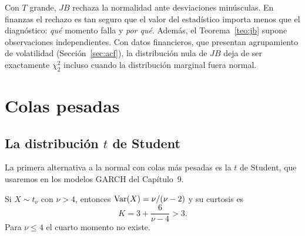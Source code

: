\begin{observacion}
Con $T$ grande, $JB$ rechaza la normalidad ante desviaciones minúsculas. En finanzas el rechazo es tan
seguro que el valor del estadístico importa menos que el diagnóstico: \emph{qué} momento falla y
\emph{por qué}. Además, el Teorema~\ref{teo:jb} supone observaciones independientes. Con datos
financieros, que presentan agrupamiento de volatilidad (Sección~\ref{sec:acf}), la distribución nula de
$JB$ deja de ser exactamente $\chi^2_2$ incluso cuando la distribución marginal fuera normal.
\end{observacion}

\section{Colas pesadas}\label{sec:colas}

\subsection{La distribución $t$ de Student}

La primera alternativa a la normal con colas más pesadas es la $t$ de Student, que usaremos en los
modelos GARCH del Capítulo~9.

\begin{proposicion}\label{prop:curt_t}
Si $X\sim t_\nu$ con $\nu>4$, entonces $\operatorname{Var}(X)=\nu/(\nu-2)$ y su curtosis es
\[
  K=3+\frac{6}{\nu-4}>3 .
\]
Para $\nu\le 4$ el cuarto momento no existe.
\end{proposicion}

